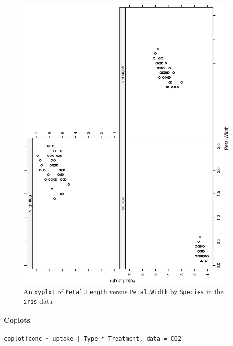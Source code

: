 \documentclass[captions=tableheading]{scrbook}
\begin{document}
\begin{figure}[th]
  \includegraphics[angle=270, totalheight=4in]{ps/xyplot.ps}
  \caption[An \texttt{xyplot} of \texttt{Petal.Length} versus \texttt{Petal.Width} by \texttt{Species}]{An \texttt{xyplot} of \texttt{Petal.Length} versus \texttt{Petal.Width} by \texttt{Species} in the \texttt{iris} data}
  \label{fig:xyplot}
\end{figure}

\paragraph*{Coplots}


\begin{verbatim}
coplot(conc ~ uptake | Type * Treatment, data = CO2)
\end{verbatim}
\end{document}
